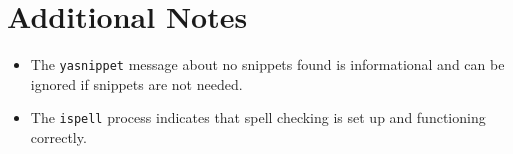 \documentclass[11pt]{article}
\begin{document}
\section{Additional Notes}
\label{sec:orgc43399a}
\begin{itemize}
\item The \texttt{yasnippet} message about no snippets found is informational and can be ignored if snippets are not needed.
\item The \texttt{ispell} process indicates that spell checking is set up and functioning correctly.
\end{itemize}
\end{document}

